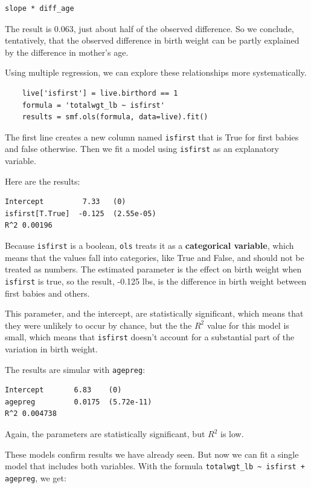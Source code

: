 \documentclass[12pt]{book}
\begin{document}
\begin{verbatim}
slope * diff_age
\end{verbatim}

The result is 0.063, just about half of the observed difference.
So we conclude, tentatively, that the observed difference in birth
weight can be partly explained by the difference in mother's age. 

Using multiple regression, we can explore these relationships
more systematically.

\begin{verbatim}
    live['isfirst'] = live.birthord == 1
    formula = 'totalwgt_lb ~ isfirst'
    results = smf.ols(formula, data=live).fit()
\end{verbatim}

The first line creates a new column named {\tt isfirst} that is
True for first babies and false otherwise.  Then we fit a model
using {\tt isfirst} as an explanatory variable.

Here are the results:

\begin{verbatim}
Intercept         7.33   (0)
isfirst[T.True]  -0.125  (2.55e-05)
R^2 0.00196
\end{verbatim}

Because {\tt isfirst} is a boolean, {\tt ols} treats it as a
{\bf categorical variable}, which means that the values fall
into categories, like True and False, and should not be treated
as numbers.  The estimated parameter is the effect on birth
weight when {\tt isfirst} is true, so the result,
-0.125 lbs, is the difference in
birth weight between first babies and others.  

This parameter, and the intercept, are statistically significant,
which means that they were unlikely to occur by chance, but the
the $R^2$ value for this model is small, which means that
{\tt isfirst} doesn't account for a substantial part of the
variation in birth weight.

The results are simular with {\tt agepreg}:

\begin{verbatim}
Intercept       6.83    (0)
agepreg         0.0175  (5.72e-11)
R^2 0.004738
\end{verbatim}

Again, the parameters are statistically significant, but
$R^2$ is low.

These models confirm results we have already seen.  But now we
can fit a single model that includes both variables.  With the
formula \verb"totalwgt_lb ~ isfirst + agepreg", we get:
\end{document}
